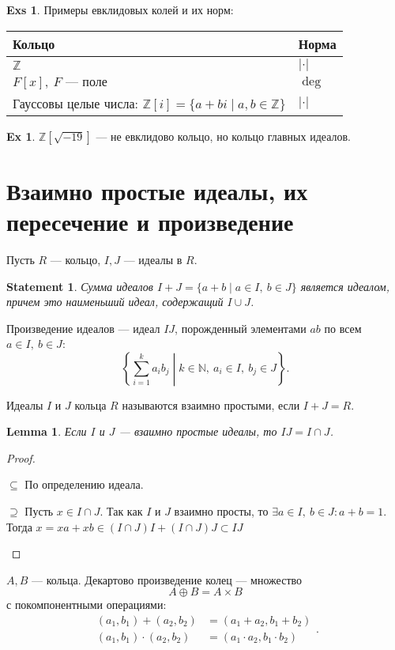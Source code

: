 \documentclass[11pt]{book}
\newcommand{\Z}{\mathbb{Z}}
\newcommand{\N}{\mathbb{N}}
\theoremstyle{definition}
\theoremstyle{plain}
\theoremstyle{plain}
\newtheorem{lm}{Lemma}
\newtheorem{st}{Statement}
\theoremstyle{definition}
\newtheorem*{ex}{Ex}
\newtheorem*{exs}{Exs}
\theoremstyle{remark}
\begin{document}
\begin{exs}
    Примеры евклидовых колей и их норм: 

    \begin{tabular}[ht]{l|l}
	\hline
	Кольцо & Норма\\
	\hline
	$ \Z$ &$ |\cdot|$\\
	$ F[x], ~ F \text{ --- поле}$ & $  \deg$\\
	Гауссовы целые числа: $ \Z[i] = \{a + bi \mid a, b \in\Z\}$ & $ |\cdot|$
    \end{tabular}
\end{exs}
\begin{ex}
    $ \Z [\sqrt{-19}]$ --- не евклидово кольцо, но кольцо главных идеалов. 
\end{ex}
\section{Взаимно простые идеалы, их пересечение и произведение}
Пусть $ R$ --- кольцо,  $ I, J$ --- идеалы в  $ R$.
\begin{st}
    Сумма идеалов $ I + J = \{a + b \mid a \in I, ~ b \in  J\}$ является идеалом, причем это наименьший идеал, содержащий $ I\cup  J$.
\end{st}
\begin{defn}
    {\sf Произведение идеалов}  --- идеал $ I J$, порожденный элементами $ ab$ по всем $ a \in I, ~ b \in J$:
   \[
   \left\{ \sum_{i = 1}^{k} a_{i}b_j \middle| k \in \N, ~ a_i \in I, ~ b_j \in  J \right\} 
   .\] 
   \end{defn}
\begin{defn}
    Идеалы $ I$ и $ J$ кольца $ R$ называются {\sf взаимно простыми}, если  $ I + J = R$.
\end{defn}
\begin{lm}
    Если $ I$ и  $ J$ ---  взаимно простые идеалы, то  $ IJ =I \cap  J $.
\end{lm}
\begin{proof}
    $ $
    \begin{description}
    \item $ \boxed{ \subseteq }$ По определению идеала.
    \item $ \boxed{\supseteq}$ Пусть $ x \in I \cap J$. Так как $ I$ и  $ J$ взаимно просты, то  $ \exists a \in I, ~ b \in J: a+ b = 1$. Тогда $ x = xa + xb \in (I \cap J) I + (I \cap J) J \subset IJ$
    \end{description}
\end{proof}
\begin{defn}
    $ A, B$ --- кольца. {\sf Декартово произведение} колец --- множество
    \[
    A \oplus B = A \times  B
    \] 
    с покомпонентными операциями:
    \[
	\begin{aligned}
	    (a_1, b_1) + (a_2, b_2) &= (a_1 + a_2, b_1 +b_2) \\
	    (a_1, b_1) \cdot  (a_2, b_2) &= (a_1 \cdot  a_2, b_1 \cdot b_2)
	\end{aligned}
    .\] 
\end{defn}
\end{document}

